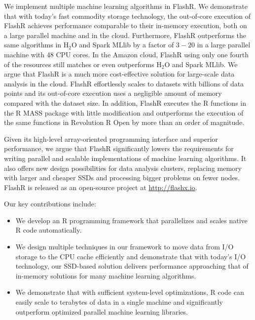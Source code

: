 We implement multiple machine learning algorithms in FlashR. We demonstrate that
with today's fast commodity storage technology, the out-of-core execution of
FlashR achieves performance comparable to their in-memory execution, both
on a large parallel machine and in the cloud. Furthermore, FlashR outperforms
the same algorithms in H$_2$O \cite{h2o} and Spark MLlib \cite{spark} by a factor
of $3-20$ in a large parallel machine with 48 CPU cores. In the Amazon cloud,
FlashR using only one fourth of the resources still matches or even outperforms
H$_2$O and Spark MLlib. We argue that FlashR is a much
more cost-effective solution for large-scale data analysis in the cloud.
FlashR effortlessly scales to datasets with billions
of data points and its out-of-core execution uses a negligible amount of memory
compared with the dataset size. In addition, FlashR executes the R functions
in the R MASS \cite{mass} package with little modification and outperforms
the execution of the same functions in Revolution R Open \cite{rro} by more
than an order of magnitude.

Given its high-level array-oriented programming interface and superior performance,
we argue that FlashR significantly lowers the requirements for writing
parallel and scalable implementations of machine learning algorithms. It also
offers new design possibilities for data analysis clusters, replacing memory
with larger and cheaper SSDs and processing bigger problems on fewer nodes.
FlashR is released as an open-source project at \href{http://flashx.io}{http://flashx.io}.

Our key contributions include:
\begin{itemize}
\item We develop an R programming framework that parallelizes and
scales native R code automatically.
\item We design multiple techniques in our framework to move data from
I/O storage to the CPU cache efficiently and demonstrate that with today's I/O
technology, our SSD-based solution delivers performance approaching that of
in-memory solutions for many machine learning algorithms.
\item We demonstrate that with sufficient system-level optimizations, R code
can easily scale to terabytes of data in a single machine and significantly
outperform optimized parallel machine learning libraries.
\end{itemize}

